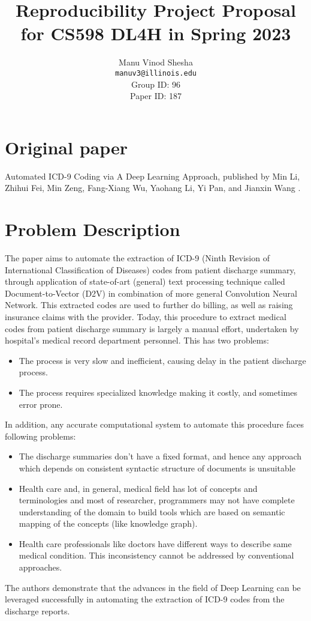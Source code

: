 \documentclass[11pt,a4paper]{article}
\title{Reproducibility Project Proposal for CS598 DL4H in Spring 2023}
\author{Manu Vinod Shesha \\
  \texttt{manuv3@illinois.edu}
  \\[2em]
  Group ID: 96\\
  Paper ID: 187}
\begin{document}
\maketitle


\section{Original paper}
Automated ICD-9 Coding via A Deep Learning Approach, published by Min Li, Zhihui Fei, Min Zeng, Fang-Xiang Wu, Yaohang Li, Yi Pan, and Jianxin Wang \cite{8320340}.

\section{Problem Description}

The paper aims to automate the extraction of ICD-9 (Ninth Revision of International Classification of Diseases) codes from patient discharge summary, through application of state-of-art (general) text processing technique called Document-to-Vector (D2V) in combination of more general Convolution Neural Network. This extracted codes are used to further do billing, as well as raising insurance claims with the provider.
Today, this procedure to extract medical codes from patient discharge summary is largely a manual effort, undertaken by hospital’s medical record department personnel. This has two problems:
\begin{itemize}
    \item The process is very slow and inefficient, causing delay in the patient discharge process.
    \item The process requires specialized knowledge making it costly, and sometimes error prone.
\end{itemize}
In addition, any accurate computational system to automate this procedure faces following problems:
\begin{itemize}
    \item The discharge summaries don’t have a fixed format, and hence any approach which depends on consistent syntactic structure of documents is unsuitable
    \item Health care and, in general, medical field has lot of concepts and terminologies and most of researcher, programmers may not have complete understanding of the domain to build tools which are based on semantic mapping of the concepts (like knowledge graph). 
    \item Health care professionals like doctors have different ways to describe same medical condition. This inconsistency cannot be addressed by conventional approaches.
\end{itemize}      
The authors demonstrate that the advances in the field of Deep Learning can be leveraged successfully in automating the extraction of ICD-9 codes from the discharge reports.
\end{document}
